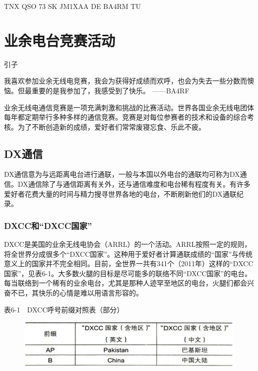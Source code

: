 \documentclass[12pt,UTF8]{ctexbook}
\begin{document}
TNX QSO 73 SK JM1XAA DE BA4RM TU

\chapter{业余电台竞赛活动}

引子

我喜欢参加业余无线电竞赛，我会为获得好成绩而欢呼，也会为失去一些分数而懊恼。但最重要的是我参加了，我感受到了快乐。
——BA4RF

业余无线电通信竞赛是一项充满刺激和挑战的比赛活动。世界各国业余无线电团体每年都定期举行多种多样的通信竞赛。竞赛是对每位参赛者的技术和设备的综合考核。为了不断创造新的成绩，爱好者们常常废寝忘食、乐此不疲。

\section{DX通信}

DX通信意为与远距离电台进行通联，一般与本国以外电台的通联均可称为DX通信。DX通信除了与通信距离有关外，还与通信难度和电台稀有程度有关。有许多爱好者花费大量的时间与精力搜寻世界各地的电台，不断刷新他们的DX通联纪录。

\subsection{DXCC和“DXCC国家”}

DXCC是美国的业余无线电协会（ARRL）的一个活动。ARRL按照一定的规则，将全世界分成很多个“DXCC国家”。这种用于爱好者计算通联成绩的“国家”与传统意义上的国家并不完全相同。目前，全世界一共有341个（2011年）这样的“DXCC国家”，见表6-1。大多数火腿的目标是尽可能多的联络不同“DXCC国家”的电台。每当联络到一个稀有的业余电台，尤其是那种人迹罕至地区的电台，火腿们都会兴奋不已，其快乐的心情是难以用语言形容的。

表6-1　DXCC呼号前缀对照表（部分）

\begin{figure}[htbp]
	\centering
	\includegraphics[width=0.7\linewidth]{69}
	\caption{}
	\label{fig:1}
\end{figure}
\end{document}
